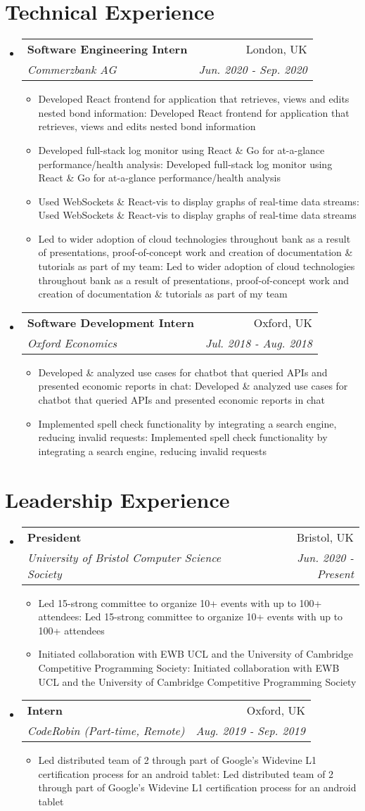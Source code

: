 \documentclass[a4paper,11pt]{article}
\makeatletter
\def \ifempty#1{\def\temp{#1} \ifx\temp\empty }
\newcommand{\resumeItem}[2]{
  \item\small{
  	\ifempty{#1}#2\else\textbf{#1}{: #2 \vspace{-2pt}}\fi
  }
}
\newcommand{\resumeSubheading}[4]{
  \vspace{-1pt}\item
    \begin{tabular*}{0.97\textwidth}{l@{\extracolsep{\fill}}r}
      \textbf{#1} & #2 \\
      \textit{\small#3} & \textit{\small #4} \\
    \end{tabular*}\vspace{-5pt}
}
\newcommand{\resumeSubHeadingListStart}{\begin{itemize}[leftmargin=*]}
\newcommand{\resumeSubHeadingListEnd}{\end{itemize}}
\newcommand{\resumeItemListStart}{\begin{itemize}}
\newcommand{\resumeItemListEnd}{\end{itemize}\vspace{-5pt}}
\makeatother
\begin{document}
\section{Technical Experience}
  \resumeSubHeadingListStart
    \resumeSubheading
      {Software Engineering Intern}{London, UK}
      {Commerzbank AG}{Jun. 2020 - Sep. 2020}
      \resumeItemListStart
      	\resumeItem{}
          {Developed React frontend for application that retrieves, views and edits nested bond information}
        \resumeItem{}
          {Developed full-stack log monitor using React \& Go for at-a-glance performance/health analysis}
        \resumeItem{}
          {Used WebSockets \& React-vis to display graphs of real-time data streams}
        \resumeItem{}
          {Led to wider adoption of cloud technologies throughout bank as a result of presentations, proof-of-concept work and creation of documentation \& tutorials as part of my team}
      \resumeItemListEnd
    \resumeSubheading
      {Software Development Intern}{Oxford, UK}
      {Oxford Economics}{Jul. 2018 - Aug. 2018}
      \resumeItemListStart
      	\resumeItem{}
          {Developed \& analyzed use cases for chatbot that queried APIs and presented economic reports in chat}
        \resumeItem{}  
          {Implemented spell check functionality by integrating a search 
          engine, reducing invalid requests}
      \resumeItemListEnd
  \resumeSubHeadingListEnd


\section{Leadership Experience}
  \resumeSubHeadingListStart
    \resumeSubheading
      {President}{Bristol, UK}
      {University of Bristol Computer Science Society}{Jun. 2020 - Present}
      \resumeItemListStart
        \resumeItem{}
          {Led 15-strong committee to organize 10+ events with up to 100+ attendees}
        \resumeItem{}
          {Initiated collaboration with EWB UCL and the University of Cambridge Competitive Programming Society}
      \resumeItemListEnd
    \resumeSubheading
      {Intern}{Oxford, UK}
      {CodeRobin (Part-time, Remote)}{Aug. 2019 - Sep. 2019}
      \resumeItemListStart
      	\resumeItem{}
          {Led distributed team of 2 through part of Google's Widevine L1 certification process for an android tablet}
      \resumeItemListEnd
  \resumeSubHeadingListEnd


\end{document}
